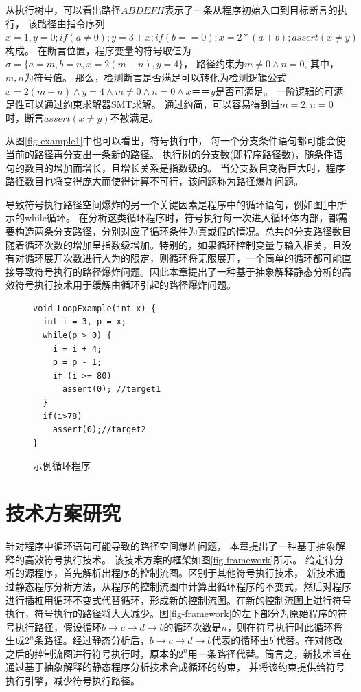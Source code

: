 从执行树中，可以看出路径$ABDEFH$表示了一条从程序初始入口到目标断言的执行，
该路径由指令序列$x=1,y=0;if(a\neq 0);y=3+x;if(b==0);x=2*(a+b);assert(x\neq y)$构成。
在断言位置，程序变量的符号取值为$\sigma = \{a = m, b = n, x=2(m+n), y=4\}$，
路径约束为$m \neq 0 \wedge n =0$, 其中，$m,n$为符号值。
那么，检测断言是否满足可以转化为检测逻辑公式
$x=2(m+n)　\wedge y=4 \wedge m \neq 0 \wedge n =0 \wedge x　＝＝ y$是否可满足。
一阶逻辑的可满足性可以通过约束求解器SMT求解。
通过约简，可以容易得到当$m = 2, n = 0$时，断言$assert(x\neq y)$不被满足。

从图\ref{fig-example1}中也可以看出，符号执行中，
每一个分支条件语句都可能会使当前的路径再分支出一条新的路径。
执行树的分支数(即程序路径数)，随条件语句的数目的增加而增长，且增长关系是指数级的。
当分支数目变得巨大时，程序路径数目也将变得庞大而使得计算不可行，该问题称为路径爆炸问题。

导致符号执行路径空间爆炸的另一个关键因素是程序中的循环语句，例如图\ref{fig-example2}中所示的while循环。
在分析这类循环程序时，符号执行每一次进入循环体内部，都需要构造两条分支路径，分别对应了循环条件为真或假的情况。总共的分支路径数目随着循环次数的增加呈指数级增加。特别的，如果循环控制变量与输入相关，且没有对循环展开次数进行人为的限定，则循环将无限展开，一个简单的循环都可能直接导致符号执行的路径爆炸问题。因此本章提出了一种基于抽象解释静态分析的高效符号执行技术用于缓解由循环引起的路径爆炸问题。


\begin{figure}[h]
\begin{lstlisting}
void LoopExample(int x) {
  int i = 3, p = x;
  while(p > 0) {
    i = i + 4;
    p = p - 1;
	if (i >= 80)
	  assert(0); //target1
  }
  if(i>78)
  	assert(0);//target2
}
\end{lstlisting}
\caption{示例循环程序}
\label{fig-example2}
\end{figure}

\section{技术方案研究}
针对程序中循环语句可能导致的路径空间爆炸问题，
本章提出了一种基于抽象解释的高效符号执行技术。
该技术方案的框架如图\ref{fig-framework}所示。
给定待分析的源程序，首先解析出程序的控制流图。区别于其他符号执行技术，
新技术通过静态程序分析方法，从程序的控制流图中计算出循环程序的不变式，然后对程序进行插桩用循环不变式代替循环，形成新的控制流图。在新的控制流图上进行符号执行，符号执行的路径将大大减少。图\ref{fig-framework}的左下部分为原始程序的符号执行路径，假设循环$b \rightarrow c \rightarrow d \rightarrow b$的循环次数是$n$，则在符号执行时此循环将生成$2^{n}$条路径。经过静态分析后，$b \rightarrow c \rightarrow d \rightarrow b$代表的循环由$b^{'}$代替。在对修改之后的控制流图进行符号执行时，原本的$2^{n}$用一条路径代替。简言之，新技术旨在通过基于抽象解释的静态程序分析技术合成循环的约束，
并将该约束提供给符号执行引擎，减少符号执行路径。

